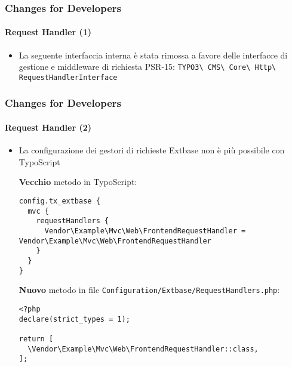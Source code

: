 
\begin{frame}[fragile]
	\frametitle{Changes for Developers}
	\framesubtitle{Request Handler (1)}

	\begin{itemize}
		\item La seguente interfaccia interna è stata rimossa
			a favore delle interfacce di gestione e middleware di richiesta PSR-15:\newline
			\texttt{TYPO3\textbackslash
				CMS\textbackslash
				Core\textbackslash
				Http\textbackslash
				RequestHandlerInterface}

	\end{itemize}

\end{frame}


\begin{frame}[fragile]
	\frametitle{Changes for Developers}
	\framesubtitle{Request Handler (2)}

	\lstset{basicstyle=\tiny\ttfamily}

	\begin{itemize}
		\item La configurazione dei gestori di richieste Extbase non è più possibile con TypoScript

		\smaller\textbf{Vecchio} metodo in TypoScript:\normalsize
\begin{lstlisting}
config.tx_extbase {
  mvc {
    requestHandlers {
      Vendor\Example\Mvc\Web\FrontendRequestHandler = Vendor\Example\Mvc\Web\FrontendRequestHandler
    }
  }
}
\end{lstlisting}

		\smaller\textbf{Nuovo} metodo in file \texttt{Configuration/Extbase/RequestHandlers.php}:\normalsize
\begin{lstlisting}
<?php
declare(strict_types = 1);

return [
  \Vendor\Example\Mvc\Web\FrontendRequestHandler::class,
];
\end{lstlisting}

	\end{itemize}

\end{frame}



